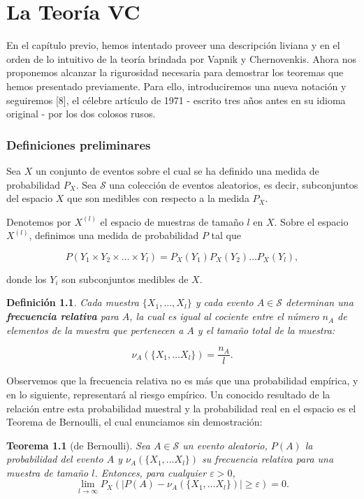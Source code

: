 \documentclass{report}
\newtheorem{thm}{Teorema}[subsection]
\newtheorem{dfn}{Definición}[subsection]
\begin{document}
\chapter{La Teoría VC}

En el capítulo previo, hemos intentado proveer una descripción liviana y en el orden de lo intuitivo de la teoría brindada por 
Vapnik y Chernovenkis. Ahora nos proponemos alcanzar la rigurosidad necesaria para demostrar los teoremas que hemos presentado 
previamente. Para ello, introduciremos una nueva notación y seguiremos [8], el célebre artículo de 1971 - escrito tres años antes en su 
idioma original - por los dos colosos rusos.\newline

\subsection{Definiciones preliminares}

Sea \( X \) un conjunto de eventos sobre el cual se ha definido una medida de probabilidad \( P_X \). Sea \( \mathcal{S} \) una colección de eventos 
aleatorios, es decir, subconjuntos del espacio \( X \) que son medibles con respecto 
a la medida \( P_X \). \newline

Denotemos por \( X^{(l)} \) el espacio de muestras de tamaño \( l \) en \( X \). 
Sobre el espacio \( X^{(l)} \), definimos una medida de probabilidad \( P \) tal que

\begin{equation}\label{def: probabilidad en espacio muestral}
P(Y_1\times Y_2 \times\dots\times Y_l) = P_X(Y_1) P_X(Y_2) \dots P_X(Y_l),
\end{equation}

donde los \( Y_i \) son subconjuntos medibles de \( X \).\newline

\begin{dfn}
Cada muestra \( \{X_1, \dots, X_l\} \) y cada evento \( A \in \mathcal{S} \) determinan 
una \textbf{frecuencia relativa} para \( A \), la cual es igual al cociente entre 
el número \( n_A \) de elementos de la muestra que pertenecen a \( A \) y el tamaño 
total de la muestra:

\[
\nu_A(\{X_1,\dots X_l\}) = \frac{n_A}{l}.
\]

\end{dfn}

Observemos que la frecuencia relativa no es más que una probabilidad empírica, y en lo siguiente, representará al riesgo
empírico. Un conocido resultado de la relación entre esta probabilidad muestral y la probabilidad real en el espacio
es el Teorema de Bernoulli, el cual enunciamos sin demostración:
\bigskip
\begin{thm}[de Bernoulli]
Sea \( A \in \mathcal{S} \) un evento aleatorio, $P(A)$ la probabilidad del evento $A$ y $\nu_A(\{X_1,\dots X_l\})$ su frecuencia relativa para una muestra de
tamaño $l$. Entonces, para cualquier $\varepsilon > 0$,
\[
    \lim_{l\to\infty} P_X\left(| P(A)-\nu_A(\{X_1,\dots X_l\})| \geq \varepsilon\right) = 0.
\]
\end{thm}
\end{document}
